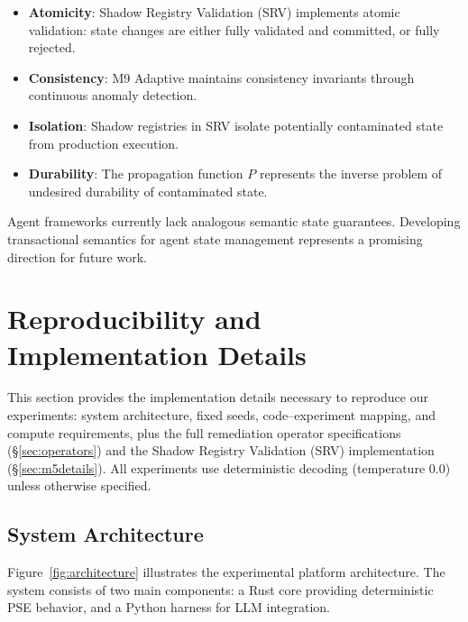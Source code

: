 \documentclass{article}
\theoremstyle{plain}
\theoremstyle{definition}
\begin{document}
\begin{itemize}
    \item \textbf{Atomicity}: Shadow Registry Validation (SRV) implements atomic validation: state changes are either fully validated and committed, or fully rejected.
    \item \textbf{Consistency}: M9 Adaptive maintains consistency invariants through continuous anomaly detection.
    \item \textbf{Isolation}: Shadow registries in SRV isolate potentially contaminated state from production execution.
    \item \textbf{Durability}: The propagation function $P$ represents the inverse problem of undesired durability of contaminated state.
\end{itemize}

Agent frameworks currently lack analogous semantic state guarantees. Developing transactional semantics for agent state management represents a promising direction for future work.

\section{Reproducibility and Implementation Details}
\label{sec:repro}

This section provides the implementation details necessary to reproduce our experiments: system architecture, fixed seeds, code--experiment mapping, and compute requirements, plus the full remediation operator specifications (\S\ref{sec:operators}) and the Shadow Registry Validation (SRV) implementation (\S\ref{sec:m5details}). All experiments use deterministic decoding (temperature 0.0) unless otherwise specified.

\subsection{System Architecture}

Figure~\ref{fig:architecture} illustrates the experimental platform architecture. The system consists of two main components: a Rust core providing deterministic PSE behavior, and a Python harness for LLM integration.
\end{document}
